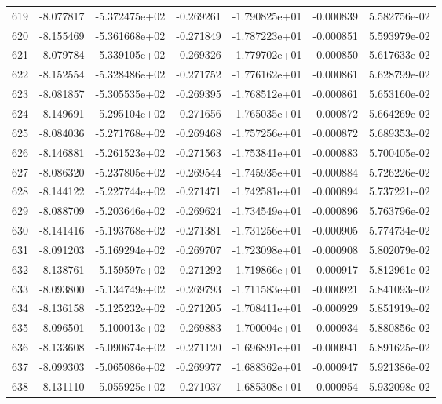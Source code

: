 \begin{tabular}{rrrrrrr}
 619 &  -8.077817 & -5.372475e+02 & -0.269261 & -1.790825e+01 &   -0.000839 &  5.582756e-02 \\
 620 &  -8.155469 & -5.361668e+02 & -0.271849 & -1.787223e+01 &   -0.000851 &  5.593979e-02 \\
 621 &  -8.079784 & -5.339105e+02 & -0.269326 & -1.779702e+01 &   -0.000850 &  5.617633e-02 \\
 622 &  -8.152554 & -5.328486e+02 & -0.271752 & -1.776162e+01 &   -0.000861 &  5.628799e-02 \\
 623 &  -8.081857 & -5.305535e+02 & -0.269395 & -1.768512e+01 &   -0.000861 &  5.653160e-02 \\
 624 &  -8.149691 & -5.295104e+02 & -0.271656 & -1.765035e+01 &   -0.000872 &  5.664269e-02 \\
 625 &  -8.084036 & -5.271768e+02 & -0.269468 & -1.757256e+01 &   -0.000872 &  5.689353e-02 \\
 626 &  -8.146881 & -5.261523e+02 & -0.271563 & -1.753841e+01 &   -0.000883 &  5.700405e-02 \\
 627 &  -8.086320 & -5.237805e+02 & -0.269544 & -1.745935e+01 &   -0.000884 &  5.726226e-02 \\
 628 &  -8.144122 & -5.227744e+02 & -0.271471 & -1.742581e+01 &   -0.000894 &  5.737221e-02 \\
 629 &  -8.088709 & -5.203646e+02 & -0.269624 & -1.734549e+01 &   -0.000896 &  5.763796e-02 \\
 630 &  -8.141416 & -5.193768e+02 & -0.271381 & -1.731256e+01 &   -0.000905 &  5.774734e-02 \\
 631 &  -8.091203 & -5.169294e+02 & -0.269707 & -1.723098e+01 &   -0.000908 &  5.802079e-02 \\
 632 &  -8.138761 & -5.159597e+02 & -0.271292 & -1.719866e+01 &   -0.000917 &  5.812961e-02 \\
 633 &  -8.093800 & -5.134749e+02 & -0.269793 & -1.711583e+01 &   -0.000921 &  5.841093e-02 \\
 634 &  -8.136158 & -5.125232e+02 & -0.271205 & -1.708411e+01 &   -0.000929 &  5.851919e-02 \\
 635 &  -8.096501 & -5.100013e+02 & -0.269883 & -1.700004e+01 &   -0.000934 &  5.880856e-02 \\
 636 &  -8.133608 & -5.090674e+02 & -0.271120 & -1.696891e+01 &   -0.000941 &  5.891625e-02 \\
 637 &  -8.099303 & -5.065086e+02 & -0.269977 & -1.688362e+01 &   -0.000947 &  5.921386e-02 \\
 638 &  -8.131110 & -5.055925e+02 & -0.271037 & -1.685308e+01 &   -0.000954 &  5.932098e-02 \\

\end{tabular}

